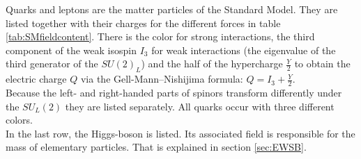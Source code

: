 Quarks and leptons are the matter particles of the Standard Model. They are listed together with their charges for the different forces in table \ref{tab:SMfieldcontent}. There is the color for strong interactions, the third component of the weak isospin $I_3$ for weak interactions (the eigenvalue of the third generator of the $SU(2)_L$) and the half of the hypercharge $\frac{Y}{2}$ to obtain the electric charge $Q$ via the Gell-Mann–Nishijima formula: $Q = I_3 + \frac{Y}{2}$.\\
Because the left- and right-handed parts of spinors transform differently under the $SU_L(2)$ they are listed separately. All quarks occur with three different colors.\\
In the last row, the Higgs-boson is listed. Its associated field is responsible for the mass of elementary particles. That is explained in section \ref{sec:EWSB}.\\
